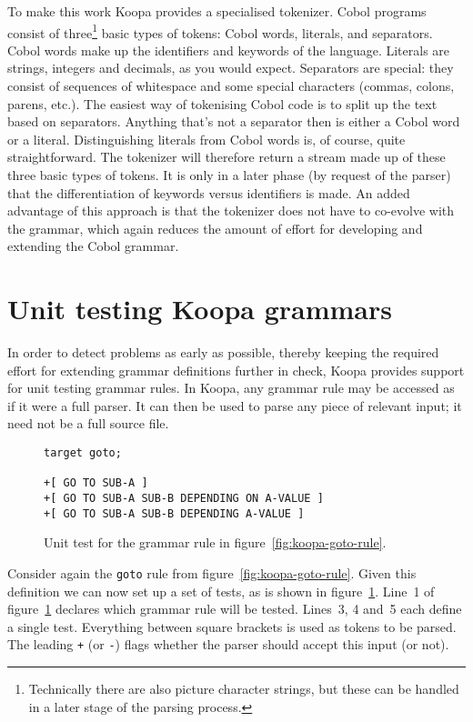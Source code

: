 \documentclass[a4paper]{article}
\begin{document}
To make this work Koopa provides a specialised tokenizer. Cobol programs consist of three\footnote{\scriptsize Technically there are also picture character strings, but these can be handled in a later stage of the parsing process.} basic types of tokens: Cobol words, literals, and separators. Cobol words make up the identifiers and keywords of the language. Literals are strings, integers and decimals, as you would expect. Separators are special: they consist of sequences of whitespace and some special characters (commas, colons, parens, etc.). The easiest way of tokenising Cobol code is to split up the text based on separators. Anything that's not a separator then is either a Cobol word or a literal. Distinguishing literals from Cobol words is, of course, quite straightforward. The tokenizer will therefore return a stream made up of these three basic types of tokens. It is only in a later phase (by request of the parser) that the differentiation of keywords versus identifiers is made. An added advantage of this approach is that the tokenizer does not have to co-evolve with the grammar, which again reduces the amount of effort for developing and extending the Cobol grammar.


\section{Unit testing Koopa grammars}
\label{testing}

In order to detect problems as early as possible, thereby keeping the required effort for extending grammar definitions further in check, Koopa provides support for unit testing grammar rules. In Koopa, any grammar rule may be accessed as if it were a full parser. It can then be used to parse any piece of relevant input; it need not be a full source file.

\begin{figure}
\centering
\begin{lstlisting}
target goto;

+[ GO TO SUB-A ]
+[ GO TO SUB-A SUB-B DEPENDING ON A-VALUE ]
+[ GO TO SUB-A SUB-B DEPENDING A-VALUE ]
\end{lstlisting}
\caption{Unit test for the grammar rule in figure~\ref{fig:koopa-goto-rule}.}
\label{fig:koopa-goto-test}
\end{figure}

Consider again the \lstinline|goto| rule from figure~\ref{fig:koopa-goto-rule}. Given this definition we can now set up a set of tests, as is shown in figure~\ref{fig:koopa-goto-test}. Line~1 of figure~\ref{fig:koopa-goto-test} declares which grammar rule will be tested. Lines~3, 4 and~5 each define a single test. Everything between square brackets is used as tokens to be parsed. The leading \lstinline|+| (or \lstinline|-|) flags whether the parser should accept this input (or not).
\end{document}
